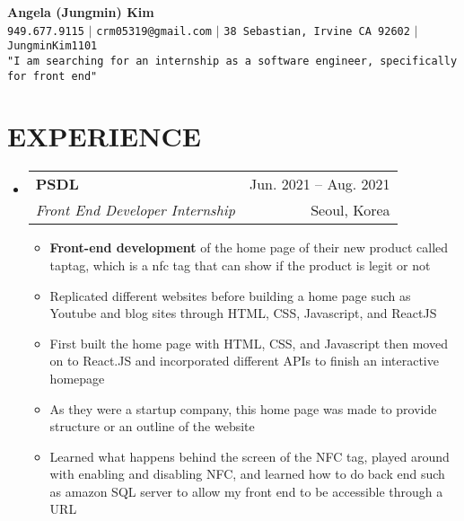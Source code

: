 \documentclass[letterpaper,11pt]{article}
\makeatletter
\newcommand{\resumeItem}[1]{
  \item\small{
    {#1 \vspace{-1pt}}
  }
}
\newcommand{\resumeSubheading}[4]{
  \vspace{-1pt}\item
    \begin{tabular*}{\textwidth}[t]{l@{\extracolsep{\fill}}r}
      \textbf{#1} & {\color{dark-grey}\small #2}\vspace{1pt}\\ %
      \textit{#3} & {\color{dark-grey} \small #4}\\ %
    \end{tabular*}\vspace{-4pt}
}
\newcommand{\resumeSubHeadingListStart}{\begin{itemize}[leftmargin=0in, label={}]}
\newcommand{\resumeSubHeadingListEnd}{\end{itemize}}
\newcommand{\resumeItemListStart}{\begin{itemize}}
\newcommand{\resumeItemListEnd}{\end{itemize}\vspace{0pt}}
\makeatother
\begin{document}
\begin{center}
    \textbf{\Huge Angela (Jungmin) Kim} \\ \vspace{5pt}
    \small \faPhone* \texttt{949.677.9115} \hspace{1pt} $|$
    \hspace{1pt} \faEnvelope \hspace{2pt} \texttt{crm05319@gmail.com} \hspace{1pt} $|$ 
    \hspace{1pt} \faMapMarker* \hspace{2pt}\texttt{38 Sebastian, Irvine CA 92602} \hspace{1pt} $|$ 
    \hspace{1pt} \faGithub \hspace{2pt}\texttt{JungminKim1101} \\ \vspace{2pt}
    \texttt{"I am searching for an internship as a software engineer, specifically for front end"}
\end{center}

\section{EXPERIENCE}
  \resumeSubHeadingListStart

    \resumeSubheading
      {PSDL}{Jun. 2021 -- Aug. 2021}
      {Front End Developer Internship}{Seoul, Korea}
      \resumeItemListStart
        \resumeItem{\textbf{Front-end development} of the home page of their new product called taptag, which is a nfc tag that can show if the product is legit or not}
        \resumeItem{Replicated different websites before building a home page such as Youtube and blog sites through HTML, CSS, Javascript, and ReactJS}
        \resumeItem{First built the home page with HTML, CSS, and Javascript then moved on to React.JS and incorporated different APIs to finish an interactive homepage}
        \resumeItem{As they were a startup company, this home page was made to provide structure or an outline of the website}
        \resumeItem{Learned what happens behind the screen of the NFC tag, played around with enabling and disabling NFC, and learned how to do back end such as amazon SQL server to allow my front end to be accessible through a URL}

    \resumeItemListEnd

  \resumeSubHeadingListEnd
\end{document}
